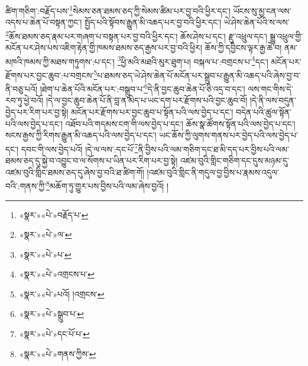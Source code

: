 ཚིག་གཅིག་:བརྗོད་པས་\footnote{«སྣར་»«པེ་»བརྗོད་པ་}སེམས་ཅན་ཐམས་ཅད་ཀྱི་སེམས་ཚིམ་པར་བྱ་བའི་ཕྱིར་དང་། ཡོངས་སུ་མྱ་ངན་ལས་འདས་པ་ཆེན་པོ་བསྟན་ཀྱང་། སྤྱོད་པའི་སྟོབས་རྒྱུན་མི་འཆད་པར་བྱ་བའི་ཕྱིར་དང་། ཡེ་ཤེས་ཆེན་པོའི་ས་ལས་\footnote{«སྣར་»«པེ་»ལ་}ཆོས་ཐམས་ཅད་རྣམ་པར་གཞག་པ་བསྟན་པར་བྱ་བའི་ཕྱིར་དང་། ཆོས་ཤེས་པ་དང་། རྫུ་འཕྲུལ་དང་། སྒྱུ་འཕྲུལ་གྱི་མངོན་པར་ཤེས་པས་འཇིག་རྟེན་གྱི་ཁམས་ཐམས་ཅད་རྒྱས་པར་བྱ་བའི་ཕྱིར། ཆོས་ཀྱི་དབྱིངས་ལྟར་རྒྱ་ཆེ་བ། ནམ་མཁའི་ཁམས་ཀྱི་མཐས་གཏུགས་:པ་དང་། \footnote{«སྣར་»«པེ་»པ་}ཕྱི་མའི་མཐའི་མུར་ཐུག་པ། བསྐལ་པ་:བགྲངས་པ་\footnote{«སྣར་»«པེ་»འགྲངས་པ་}དང་། མངོན་པར་རྫོགས་པར་བྱང་ཆུབ་:པ་བགྲངས་\footnote{«སྣར་»«པེ་»པའོ། །འགྲངས་}པ་ཐམས་ཅད་ཡེ་ཤེས་ཆེན་པོ་མངོན་པར་སྒྲུབ་པ་རྒྱུན་མི་འཆད་པའི་ཞེས་བྱ་བ་ནི་བཅུ་པའོ། །ཐེག་པ་ཆེན་པོའི་མངོན་པར་:བསྒྲུབ་པ་\footnote{«སྣར་»«པེ་»སྒྲུབ་པ་}དེ་ནི་བྱང་ཆུབ་ཆེན་པོ་ཅི་འདྲ་བ་དང་། ལས་གང་གིས་དེ་རབ་ཏུ་ཕྱེ་བའོ། །དེ་ལ་བྱང་ཆུབ་ཆེན་པོ་ནི་བླ་ན་མེད་པ་ཡང་དག་པར་རྫོགས་པའི་བྱང་ཆུབ་བོ། །དེ་ནི་ལས་བདུན་བྱེད་པར་རིག་པར་བྱ་སྟེ། མངོན་པར་རྫོགས་པར་བྱང་ཆུབ་པ་སྟོན་པའི་ལས་བྱེད་པ་དང་། བདེན་པའི་ཚུལ་སྟོན་པའི་ལས་བྱེད་པ་དང་། འཐོབ་པའི་གདམས་ངག་གི་ལས་བྱེད་པ་དང་། ཆོས་སྣ་ཚོགས་སྟོན་པའི་ལས་བྱེད་པ་དང་། སངས་རྒྱས་ཀྱི་རིགས་རྒྱུན་མི་འཆད་པའི་ལས་བྱེད་པ་དང་། ཡང་ཆོས་ཀྱི་ལུགས་གནས་པར་བྱེད་པའི་ལས་བྱེད་པ་དང་། དབང་གི་ལས་བྱེད་པའོ། །དེ་ལ་ལས་:དང་པོ་\footnote{«སྣར་»«པེ་»དང་པོ་པ་}ནི་བྱིས་པའི་ལམ་གཅིག་དང་ཐ་མི་དད་པར་བྱིས་པའི་ལམ་ཐམས་ཅད་དུ་སྐྱེ་བ་འབྱུང་བ་ལ་སོགས་པ་ཡིན་པར་རིག་པར་བྱ་སྟེ། འཛམ་བུའི་གླིང་གཅིག་དང་དུས་མཉམ་དུ་འཛམ་བུའི་གླིང་ཐམས་ཅད་དུ་ཞེས་བྱ་བའི་ཐ་ཚིག་གོ། །འཛམ་བུའི་གླིང་ནི་གདུལ་བྱ་བྱིས་པ་རྣམས་འདུལ་བའི་:གནས་ཀྱི་\footnote{«སྣར་»«པེ་»གནས་ཀྱིས་}མཆོག་ཏུ་གྱུར་པས་བྱིས་པའི་ལམ་ཞེས་བྱའོ། །
